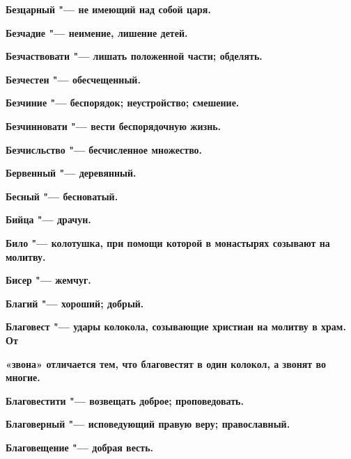 \begin{multicols}{2}
\bfseries Безцарный\normalfont{} "--- не имеющий над собой царя. 




\bfseries Безчадие\normalfont{} "--- неимение, лишение детей. 




\bfseries Безчаствовати\normalfont{} "--- лишать положенной части; обделять. 




\bfseries Безчестен\normalfont{} "--- обесчещенный. 




\bfseries Безчиние\normalfont{} "--- беспорядок; неустройство; смешение. 




\bfseries Безчинновати\normalfont{} "--- вести беспорядочную жизнь. 




\bfseries Безчисльство\normalfont{} "--- бесчисленное множество. 




\bfseries Бервенный\normalfont{} "--- деревянный. 




\bfseries Бесный\normalfont{} "--- бесноватый. 




\bfseries Бийца\normalfont{} "--- драчун. 




\bfseries Било\normalfont{} "--- колотушка, при помощи которой в монастырях созывают на молитву. 




\bfseries Бисер\normalfont{} "--- жемчуг. 




\bfseries Благий\normalfont{} "--- хороший; добрый. 




\bfseries Благовест\normalfont{} "--- удары колокола, созывающие христиан на молитву в храм. От 




\bfseries «звона»\normalfont{} отличается тем, что благовестят в один колокол, а звонят во многие. 




\bfseries Благовестити\normalfont{} "--- возвещать доброе; проповедовать. 




\bfseries Благоверный\normalfont{} "--- исповедующий правую веру; православный. 




\bfseries Благовещение\normalfont{} "--- добрая весть. 





\end{multicols}

